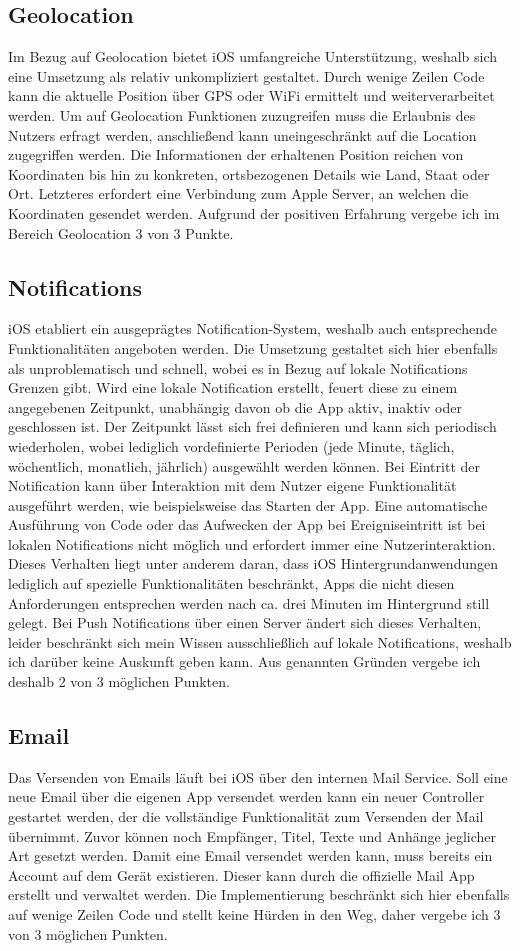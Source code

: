 \subsection{Geolocation}
Im Bezug auf Geolocation bietet iOS umfangreiche Unterstützung, weshalb sich eine Umsetzung als relativ unkompliziert gestaltet. Durch wenige Zeilen Code kann die aktuelle Position über GPS oder WiFi ermittelt und weiterverarbeitet werden. Um auf Geolocation Funktionen zuzugreifen muss die Erlaubnis des Nutzers erfragt werden, anschließend kann uneingeschränkt auf die Location zugegriffen werden. Die Informationen der erhaltenen Position reichen von Koordinaten bis hin zu konkreten, ortsbezogenen Details wie Land, Staat oder Ort. Letzteres erfordert eine Verbindung zum Apple Server, an welchen die Koordinaten gesendet werden. Aufgrund der positiven Erfahrung vergebe ich im Bereich Geolocation 3 von 3 Punkte.
\subsection{Notifications}
iOS etabliert ein ausgeprägtes Notification-System, weshalb auch entsprechende Funktionalitäten angeboten werden. Die Umsetzung gestaltet sich hier ebenfalls als unproblematisch und schnell, wobei es in Bezug auf lokale Notifications Grenzen gibt. Wird eine lokale Notification erstellt, feuert diese zu einem angegebenen Zeitpunkt, unabhängig davon ob die App aktiv, inaktiv oder geschlossen ist. Der Zeitpunkt lässt sich frei definieren und kann sich periodisch wiederholen, wobei lediglich vordefinierte Perioden (jede Minute, täglich, wöchentlich, monatlich, jährlich) ausgewählt werden können. Bei Eintritt der Notification kann über Interaktion mit dem Nutzer eigene Funktionalität ausgeführt werden, wie beispielsweise das Starten der App. Eine automatische Ausführung von Code oder das Aufwecken der App bei Ereigniseintritt ist bei lokalen Notifications nicht möglich und erfordert immer eine Nutzerinteraktion.
Dieses Verhalten liegt unter anderem daran, dass iOS Hintergrundanwendungen lediglich auf spezielle Funktionalitäten beschränkt, Apps die nicht diesen Anforderungen entsprechen werden nach ca. drei Minuten im Hintergrund still gelegt.
Bei Push Notifications über einen Server ändert sich dieses Verhalten, leider beschränkt sich mein Wissen ausschließlich auf lokale Notifications, weshalb ich darüber keine Auskunft geben kann. Aus genannten Gründen vergebe ich deshalb 2 von 3 möglichen Punkten.
\subsection{Email}
Das Versenden von Emails läuft bei iOS über den internen Mail Service. Soll eine neue Email über die eigenen App versendet werden kann ein neuer Controller gestartet werden, der die vollständige Funktionalität zum Versenden der Mail übernimmt. Zuvor können noch Empfänger, Titel, Texte und Anhänge jeglicher Art gesetzt werden. Damit eine Email versendet werden kann, muss bereits ein Account auf dem Gerät existieren. Dieser kann durch die offizielle Mail App erstellt und verwaltet werden. Die Implementierung beschränkt sich hier ebenfalls auf wenige Zeilen Code und stellt keine Hürden in den Weg, daher vergebe ich 3 von 3 möglichen Punkten.
